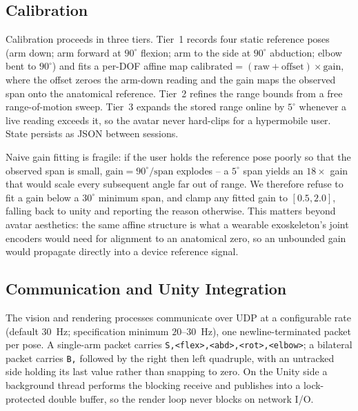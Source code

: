 \documentclass[conference]{IEEEtran}
\begin{document}
\subsection{Calibration}
\label{sec:calibration}
Calibration proceeds in three tiers. Tier~1 records four static
reference poses (arm down; arm forward at $90^\circ$ flexion; arm to the
side at $90^\circ$ abduction; elbow bent to $90^\circ$) and fits a
per-DOF affine map
$\text{calibrated} = (\text{raw} + \text{offset})\times\text{gain}$,
where the offset zeroes the arm-down reading and the gain maps the
observed span onto the anatomical reference. Tier~2 refines the range
bounds from a free range-of-motion sweep. Tier~3 expands the stored range
online by $5^\circ$ whenever a live reading exceeds it, so the avatar
never hard-clips for a hypermobile user. State persists as JSON between
sessions.

Naive gain fitting is fragile: if the user holds the reference pose
poorly so that the observed span is small, $\text{gain} = 90^\circ /
\text{span}$ explodes -- a $5^\circ$ span yields an $18\times$ gain that
would scale every subsequent angle far out of range. We therefore refuse
to fit a gain below a $30^\circ$ minimum span, and clamp any fitted gain
to $[0.5, 2.0]$, falling back to unity and reporting the reason
otherwise. This matters beyond avatar aesthetics: the same affine
structure is what a wearable exoskeleton's joint encoders would need for
alignment to an anatomical zero, so an unbounded gain would propagate
directly into a device reference signal.

\subsection{Communication and Unity Integration}
\label{sec:unity}
The vision and rendering processes communicate over UDP at a configurable
rate (default $30$~Hz; specification minimum $20$--$30$~Hz), one
newline-terminated packet per pose. A single-arm packet carries
\texttt{S,<flex>,<abd>,<rot>,<elbow>}; a bilateral packet carries
\texttt{B,} followed by the right then left quadruple, with an untracked
side holding its last value rather than snapping to zero. On the Unity
side a background thread performs the blocking receive and publishes into
a lock-protected double buffer, so the render loop never blocks on
network I/O.
\end{document}
